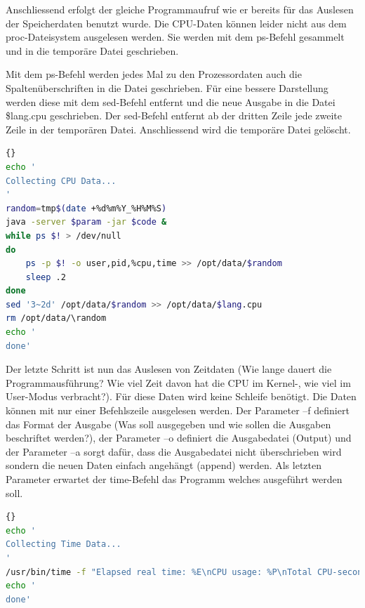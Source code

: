 \documentclass{fancydocument}
\begin{document}
Anschliessend erfolgt der gleiche Programmaufruf wie er bereits für das Auslesen der Speicherdaten benutzt wurde. Die CPU-Daten können leider nicht aus dem proc-Dateisystem ausgelesen werden. Sie werden mit dem ps-Befehl gesammelt und in die temporäre Datei geschrieben.

Mit dem ps-Befehl werden jedes Mal zu den Prozessordaten auch die Spaltenüberschriften in die Datei geschrieben. Für eine bessere Darstellung werden diese mit dem sed-Befehl entfernt und die neue Ausgabe in die Datei \$lang.cpu geschrieben. Der sed-Befehl entfernt ab der dritten Zeile jede zweite Zeile in der temporären Datei. Anschliessend wird die temporäre Datei gelöscht.

\begin{minipage}{\textwidth}
\begin{lstlisting}[language=bash,caption=CPU-Daten sammeln]{}
echo '
Collecting CPU Data...
'
random=tmp$(date +%d%m%Y_%H%M%S)
java -server $param -jar $code &	
while ps $! > /dev/null
do
	ps -p $! -o user,pid,%cpu,time >> /opt/data/$random
	sleep .2
done
sed '3~2d' /opt/data/$random >> /opt/data/$lang.cpu
rm /opt/data/\random
echo '
done'
\end{lstlisting}
\end{minipage}

Der letzte Schritt ist nun das Auslesen von Zeitdaten (Wie lange dauert die Programmausführung? Wie viel Zeit davon hat die CPU im Kernel-, wie viel im User-Modus verbracht?). Für diese Daten wird keine Schleife benötigt. Die Daten können mit nur einer Befehlszeile ausgelesen werden. Der Parameter –f definiert das Format der Ausgabe (Was soll ausgegeben und wie sollen die Ausgaben beschriftet werden?), der Parameter –o definiert die Ausgabedatei (Output) und der Parameter –a sorgt dafür, dass die Ausgabedatei nicht überschrieben wird sondern die neuen Daten einfach angehängt (append) werden. Als letzten Parameter erwartet der time-Befehl das Programm welches ausgeführt werden soll.

\begin{minipage}{\textwidth}
\begin{lstlisting}[language=bash,caption=Zeitdaten sammeln]{}
echo '
Collecting Time Data...
'
/usr/bin/time -f "Elapsed real time: %E\nCPU usage: %P\nTotal CPU-seconds in user mode: %U\nTotal CPU-seconds in kernel mode: %S\nName and arguments of the command: %C" -o /opt/data/$lang.time -a java -server $param -jar $code
echo '
done'
\end{lstlisting}
\end{minipage}
\end{document}
